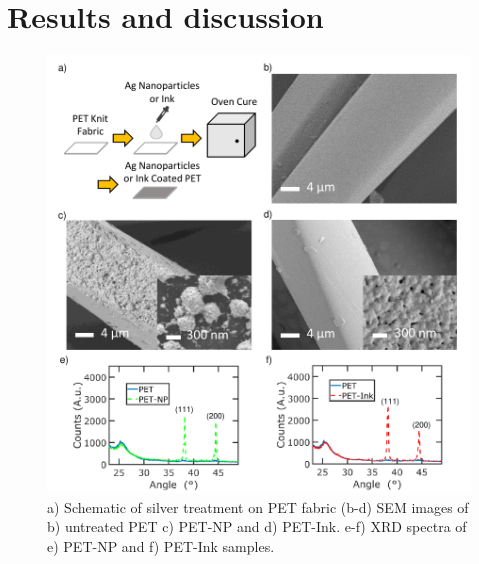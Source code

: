 \documentclass[journal=jacsat,manuscript=article]{achemso}
\begin{document}

 
\section{Results and discussion}


\begin{figure}[H]
       \centering
    \includegraphics[width= \linewidth]{Figures/fig1_char.pdf}
   \caption[Scanning Electron Microscopy]{a) Schematic of silver treatment on PET fabric (b-d) SEM images of b) untreated PET c) PET-NP and d) PET-Ink. e-f) XRD spectra of e) PET-NP and f) PET-Ink samples.}
  
\label{fig:SEM}
\end{figure}
\end{document}
